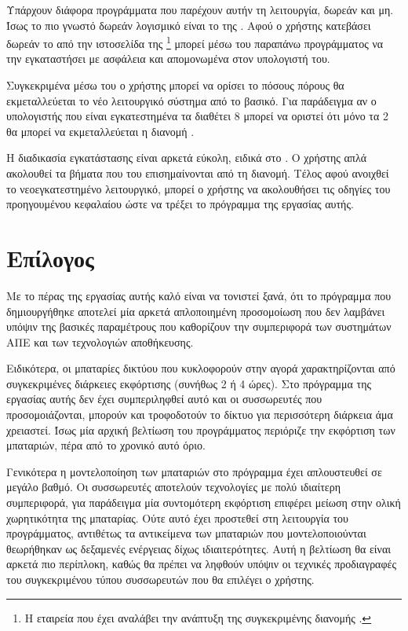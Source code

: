 \documentclass[12pt]{report}
\begin{document}
{Υπάρχουν διάφορα προγράμματα που παρέχουν αυτήν τη λειτουργία, δωρεάν και μη. Ίσως το πιο γνωστό δωρεάν λογισμικό είναι το {} της {}. Αφού ο χρήστης κατεβάσει δωρεάν το
{} από την ιστοσελίδα της {}\footnote{Η εταιρεία που έχει αναλάβει την ανάπτυξη της συγκεκριμένης διανομής {}.} μπορεί μέσω του παραπάνω προγράμματος να την εγκαταστήσει 
με ασφάλεια και απομονωμένα στον υπολογιστή του. 

Συγκεκριμένα μέσω του {} ο χρήστης μπορεί να ορίσει το πόσους πόρους θα εκμεταλλεύεται το νέο λειτουργικό σύστημα από το βασικό. Για παράδειγμα αν ο υπολογιστής που είναι εγκατεστημένα τα {} 
διαθέτει 8 {} μπορεί να οριστεί ότι μόνο τα 2 {} θα μπορεί να εκμεταλλεύεται η διανομή {}. 

Η διαδικασία εγκατάστασης είναι αρκετά εύκολη, ειδικά στο {}. Ο χρήστης απλά ακολουθεί τα βήματα που του επισημαίνονται από τη διανομή. Τέλος αφού ανοιχθεί το νεοεγκατεστημένο λειτουργικό, μπορεί ο χρήστης 
να ακολουθήσει τις οδηγίες του προηγουμένου κεφαλαίου ώστε να τρέξει το πρόγραμμα της εργασίας αυτής. 

\chapter{Επίλογος}
Με το πέρας της εργασίας αυτής καλό είναι να τονιστεί ξανά, ότι το πρόγραμμα που δημιουργήθηκε αποτελεί μία αρκετά απλοποιημένη προσομοίωση που δεν λαμβάνει υπόψιν της βασικές παραμέτρους που καθορίζουν την συμπεριφορά 
των συστημάτων ΑΠΕ και των τεχνολογιών αποθήκευσης. 

Ειδικότερα, οι μπαταρίες δικτύου που κυκλοφορούν στην αγορά χαρακτηρίζονται από συγκεκριμένες διάρκειες εκφόρτισης (συνήθως 2 ή 4 ώρες). Στο πρόγραμμα της εργασίας αυτής
δεν έχει συμπεριληφθεί αυτό και οι συσσωρευτές που προσομοιάζονται, μπορούν και τροφοδοτούν το δίκτυο για περισσότερη διάρκεια άμα χρειαστεί. Ίσως μία αρχική βελτίωση του προγράμματος περιόριζε την εκφόρτιση των μπαταριών, πέρα 
από το χρονικό αυτό όριο.

Γενικότερα η μοντελοποίηση των μπαταριών στο πρόγραμμα έχει απλουστευθεί σε μεγάλο βαθμό. Οι συσσωρευτές αποτελούν τεχνολογίες με πολύ ιδιαίτερη συμπεριφορά, για παράδειγμα μία συντομότερη εκφόρτιση επιφέρει μείωση στην ολική
χωρητικότητα της μπαταρίας. Ούτε αυτό έχει προστεθεί στη λειτουργία του προγράμματος, αντιθέτως τα αντικείμενα των μπαταριών που μοντελοποιούνται θεωρήθηκαν ως δεξαμενές ενέργειας δίχως ιδιαιτερότητες. Αυτή η βελτίωση θα είναι 
αρκετά πιο περίπλοκη, καθώς θα πρέπει να ληφθούν υπόψιν οι τεχνικές προδιαγραφές του συγκεκριμένου τύπου συσσωρευτών που θα επιλέγει ο χρήστης.

}
\end{document}
